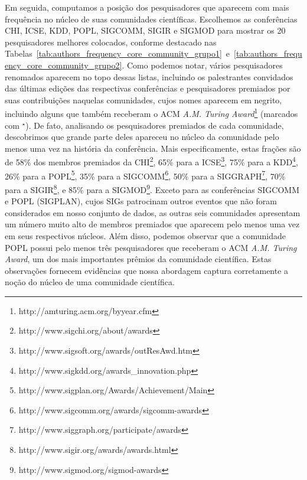 Em seguida, computamos a posição dos pesquisadores que aparecem com mais 
frequência no núcleo de suas comunidades científicas. Escolhemos 
as conferências CHI, ICSE, KDD, POPL, SIGCOMM, SIGIR e SIGMOD para 
mostrar os 20 pesquisadores melhores colocados, conforme destacado nas
Tabelas~\ref{tab:authors_frequency_core_community_grupo1}~e~\ref{tab:authors_frequency_core_community_grupo2}. 
Como podemos notar, vários pesquisadores renomados aparecem no topo dessas 
listas, incluindo os palestrantes convidados das últimas edições das respectivas 
conferências e pesquisadores premiados por suas contribuições naquelas comunidades, 
cujos nomes aparecem em negrito, incluindo alguns que também receberam o ACM \textit{A.M. 
Turing Award}\footnote{http://amturing.acm.org/byyear.cfm} (marcados com $^\star$). De fato, analisando os pesquisadores premiados 
de cada comunidade, descobrimos que grande parte deles apareceu no núcleo da 
comunidade pelo menos uma vez na história da conferência. Mais especificamente, estas 
frações são de 58\% dos membros premiados da CHI\footnote{http://www.sigchi.org/about/awards}, 
65\% para a ICSE\footnote{http://www.sigsoft.org/awards/outResAwd.htm}, 75\% para a 
KDD\footnote{http://www.sigkdd.org/awards\_innovation.php}, 26\% para a 
POPL\footnote{http://www.sigplan.org/Awards/Achievement/Main}, 35\% para a 
SIGCOMM\footnote{http://www.sigcomm.org/awards/sigcomm-awards}, 50\% para a 
SIGGRAPH\footnote{http://www.siggraph.org/participate/awards}, 70\% para a
SIGIR\footnote{http://www.sigir.org/awards/awards.html}, e 85\% para a 
SIGMOD\footnote{http://www.sigmod.org/sigmod-awards}. Exceto para as conferências SIGCOMM 
e POPL (SIGPLAN), cujos SIGs patrocinam outros eventos que não foram considerados 
em nosso conjunto de dados, as outras seis comunidades apresentam um número muito 
alto de membros premiados que aparecem pelo menos uma vez em seus respectivos 
núcleos. Além disso, podemos observar que a comunidade POPL possui pelo menos três 
pesquisadores que receberam o ACM \textit{A.M. Turing Award}, 
um dos mais importantes prêmios da comunidade científica. Estas observações fornecem evidências 
que nossa abordagem captura corretamente a noção do núcleo de uma comunidade científica.

